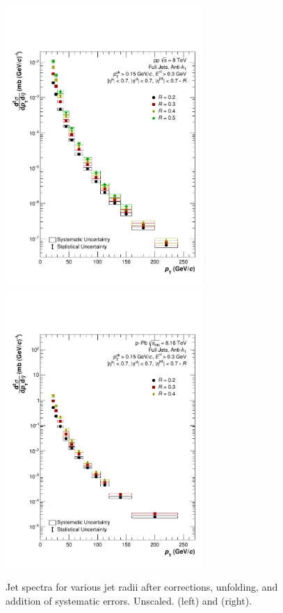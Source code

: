 \begin{figure}
    \centering
    \includegraphics[width=7.5cm]{figures/FinalResults/Bayes_reg6_unscaled.pdf}
    \includegraphics[width=7.5cm]{figures/pPbFigures/FinalResults/Bayes_reg6_unscaled.pdf}
    \caption{Jet spectra for various jet radii after corrections, unfolding, and addition of systematic errors. Unscaled. \pp (left) and \pPb (right).}
    \label{fig:finalSpectraUnscaled}
\end{figure}

